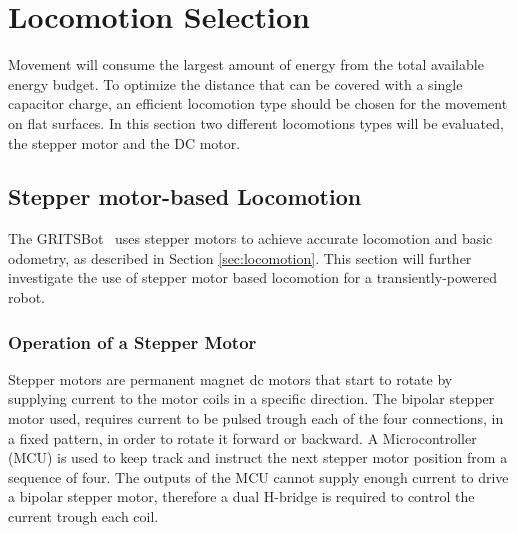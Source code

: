 \section{Locomotion Selection}

Movement will consume the largest amount of energy from the total available energy budget.
To optimize the distance that can be covered with a single capacitor charge, an efficient locomotion type should be chosen for the movement on flat surfaces.
In this section two different locomotions types will be evaluated, the stepper motor and the DC motor.


\subsection{Stepper motor-based Locomotion}

The GRITSBot~\cite{pickem_icra_2015} uses stepper motors to achieve accurate locomotion and basic odometry, as described in Section \ref{sec:locomotion}.
This section will further investigate the use of stepper motor based locomotion for a transiently-powered robot.

\subsubsection{Operation of a Stepper Motor}
Stepper motors are permanent magnet dc motors that start to rotate by supplying current to the motor coils in a specific direction.
The bipolar stepper motor used, requires current to be pulsed trough each of the four connections, in a fixed pattern, in order to rotate it forward or backward.
A Microcontroller (MCU) is used to keep track and instruct the next stepper motor position from a sequence of four.
The outputs of the MCU cannot supply enough current to drive a bipolar stepper motor, therefore a dual H-bridge is required to control the current trough each coil.

